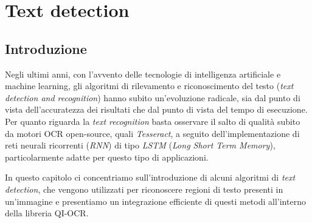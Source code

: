 \chapter{Text detection}
\label{chap:text-detection}


\section{Introduzione}
Negli ultimi anni, con l'avvento delle tecnologie di intelligenza artificiale e machine learning, gli algoritmi di rilevamento e riconoscimento del testo (\textit{text detection and recognition}) hanno subito un'evoluzione radicale, sia dal punto di vista dell'accuratezza dei risultati che dal punto di vista del tempo di esecuzione. Per quanto riguarda la \textit{text recognition} basta osservare il salto di qualit\`a subito da motori OCR open-source, quali \textit{Tesseract}, a seguito dell'implementazione di reti neurali ricorrenti (\textit{RNN}) di tipo \textit{LSTM} (\textit{Long Short Term Memory}), particolarmente adatte per questo tipo di applicazioni.\par
In questo capitolo ci concentriamo sull'introduzione di alcuni algoritmi di \textit{text detection}, che vengono utilizzati per riconoscere regioni di testo presenti in un'immagine e presentiamo un integrazione efficiente di questi metodi all'interno della libreria QI-OCR. 


